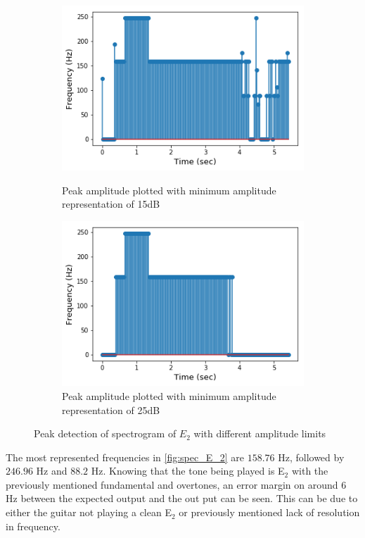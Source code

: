 \begin{figure}[H]
\begin{subfigure}{0.49\textwidth}
\end{subfigure}
\begin{subfigure}{0.49\textwidth}
\centering
\includegraphics[width=\textwidth]{figures/peak_detection/20170511_15.png}
\caption{Peak amplitude plotted with minimum amplitude representation of 15dB}
\label{fig:freq_15dB_Amp_pass}

\includegraphics[width=\textwidth]{figures/peak_detection/20170511_25.png}
\caption{Peak amplitude plotted with minimum amplitude representation of 25dB}
\label{fig:freq_25dB_Amp_pass}

\end{subfigure}
\caption{Peak detection of spectrogram of $E_2$ with different amplitude limits}
\label{fig:valdation_peak_detection}
\end{figure}

The most represented frequencies in \ref{fig:spec_E_2} are $158.76$ Hz, followed by $246.96$ Hz and $88.2$ Hz. 
Knowing that the tone being played is E$_2$ with the previously mentioned fundamental and overtones, an error margin on around $6$ Hz between the expected output and the out put can be seen.
This can be due to either the guitar not playing a clean E$_2$ or previously mentioned lack of resolution in frequency.

